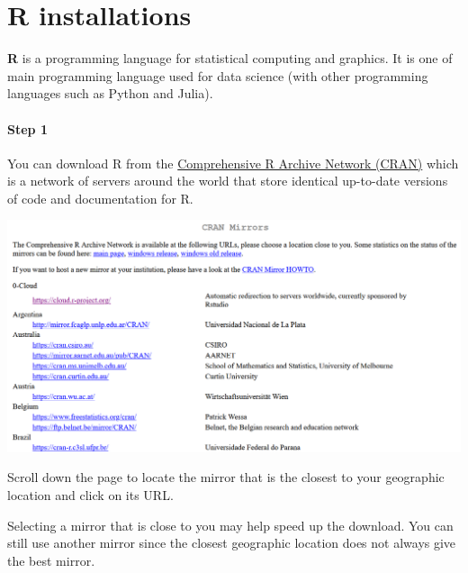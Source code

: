 \documentclass[
  letterpaper,
  DIV=11,
  numbers=noendperiod,
  oneside]{scrreprt}
\begin{document}
\appendix
{}

\hypertarget{r-installations}{%
\chapter{R installations}\label{r-installations}}

\textbf{R} is a programming language for statistical computing and
graphics. It is one of main programming language used for data science
(with other programming languages such as Python and Julia).

\hypertarget{step-1-1}{%
\subsubsection{Step 1}\label{step-1-1}}

You can download R from the
\href{https://cran.r-project.org/mirrors.html}{Comprehensive R Archive
Network (CRAN)} which is a network of servers around the world that
store identical up-to-date versions of code and documentation for R.

\includegraphics{./images/paste-13103C13.png}

Scroll down the page to locate the mirror that is the closest to your
geographic location and click on its URL.

\begin{tcolorbox}[enhanced jigsaw, colbacktitle=quarto-callout-tip-color!10!white, titlerule=0mm, breakable, opacityback=0, opacitybacktitle=0.6, left=2mm, coltitle=black, colback=white, title=\textcolor{quarto-callout-tip-color}{\faLightbulb}\hspace{0.5em}{Tip}, rightrule=.15mm, colframe=quarto-callout-tip-color-frame, toprule=.15mm, bottomtitle=1mm, toptitle=1mm, arc=.35mm, bottomrule=.15mm, leftrule=.75mm]
Selecting a mirror that is close to you may help speed up the download.
You can still use another mirror since the closest geographic location
does not always give the best mirror.
\end{tcolorbox}
\end{document}
